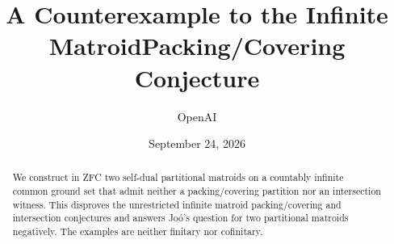\documentclass[11pt]{article}
\title{A Counterexample to the Infinite Matroid\newline Packing/Covering Conjecture}
\author{OpenAI}
\date{September 24, 2026}
\theoremstyle{definition}
\theoremstyle{remark}
\numberwithin{equation}{section}
\begin{document}
\maketitle
\begin{abstract}
We construct in ZFC two self-dual partitional matroids on a countably infinite
common ground set that admit neither a packing/covering partition nor an
intersection witness. This disproves the unrestricted infinite matroid
packing/covering and intersection conjectures and answers Jo\'o's question
for two partitional matroids negatively. The examples are neither finitary
nor cofinitary.
\end{abstract}
\begingroup
\small
\tableofcontents
\endgroup
\clearpage







\begingroup\small


\endgroup
\end{document}

